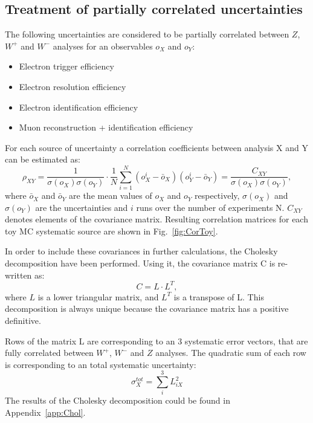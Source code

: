 \subsection{Treatment of partially correlated uncertainties}\label{sec:partCor}

The following uncertainties are considered to be partially correlated between $Z$, $W^{+}$ and $W^{-}$ analyses for an observables $o_X$ and $o_Y$:
\begin{itemize}
\item Electron trigger efficiency
\item Electron resolution efficiency
\item Electron identification efficiency
\item Muon reconstruction + identification efficiency
\end{itemize}

For each source of uncertainty a correlation coefficients between analysis X and Y can be estimated as:
\begin{equation}\label{eq:Corr}
\rho_{XY}=\frac{1}{\sigma(o_X)\sigma(o_Y)}\cdot \frac{1}{N} \sum_{i=1}^N (o^i_X-\bar{o}_X) (o^i_Y-\bar{o}_Y)=\frac{C_{XY}}{\sigma(o_X)\sigma(o_Y)},
\end{equation}
where $\bar{o}_X$ and $\bar{o}_Y$ are the mean values of $o_X$ and $o_Y$ respectively,  $\sigma(o_X)$ and $\sigma(o_Y)$ are the uncertainties and $i$ runs over the number of experiments N. $C_{XY}$ denotes elements of the covariance matrix. Resulting correlation matrices for each toy MC systematic source are shown in Fig.~\ref{fig:CorToy}.



In order to include these covariances in further calculations, the Cholesky decomposition \cite{Dickinson1978} have been performed. Using it, the covariance matrix C is re-written as:
\begin{equation}
C=L \cdot L^{T},
\end{equation}
where $L$ is a lower triangular matrix, and $L^{T}$ is a transpose of L. This decomposition is always unique because the covariance matrix has a positive definitive.
 
Rows of the matrix L are corresponding to an 3 systematic error vectors, that are fully correlated between $W^{+}$, $W^{-}$ and $Z$ analyses. The quadratic sum of each row is corresponding to an total systematic uncertainty:
\begin{equation}
\sigma_{X}^{tot} = \sum_{i}^3 L_{iX}^2
\end{equation}
The results of the Cholesky decomposition could be found in Appendix~\ref{app:Chol}.




